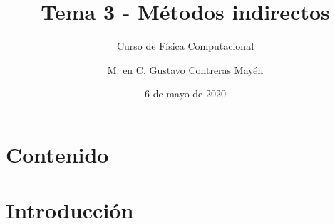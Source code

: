 
\title{Tema 3 - Métodos indirectos}
\subtitle{Curso de Física Computacional}
\author[]{M. en C. Gustavo Contreras Mayén}
\date{6 de mayo de 2020}

\maketitle
\fontsize{14}{14}\selectfont
{}
\section*{Contenido}
\section{Introducción}
